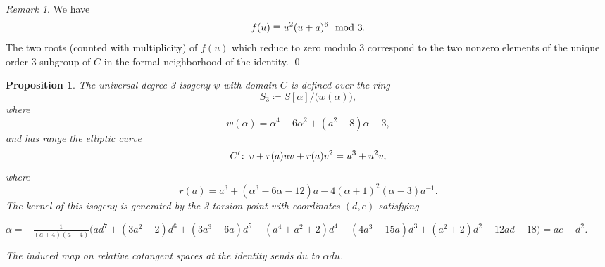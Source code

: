 \documentclass{gtpart}
\newtheorem{prop}[thm]{Proposition}
\theoremstyle{definition}
\theoremstyle{remark}
\newtheorem{rmk}[thm]{Remark}
\def\co{\colon\thinspace}
\newcommand{\md}{~~{\rm mod}~}
\newcommand{\A}{\alpha}
\begin{document}
\begin{rmk}
\label{rmk:dmod3}
 We have 
 \[
  f(u) \equiv u^2 (u + a)^6 \md 3.  
 \]
 The two roots (counted with multiplicity) of $f(u)$ which reduce to zero modulo 3 correspond to 
 the two nonzero elements of the unique order 3 subgroup of $C$ in the formal neighborhood of the identity.  
\qed
\end{rmk}

\begin{prop}
\label{prop:isog}
 The universal degree 3 isogeny $\psi$ with domain $C$ is defined over the ring 
 \[
  S_3 \coloneqq S[\A] \big/ \big( w(\A) \big), 
 \]
 where 
 \[
  w(\A) = \A^4 - 6 \A^2 + (a^2 - 8) \A - 3, 
 \]
 and has range the elliptic curve 
 \[
  C' \co v + r(a) u v + r(a) v^2 = u^3 + u^2 v, 
 \]
 where 
 \[
  r(a) = a^3 + (\A^3 - 6 \A - 12) a - 4 (\A + 1)^2 (\A - 3) a^{-1}.  
 \]
 The kernel of this isogeny is generated by the 3-torsion point with coordinates $(d,e)$ satisfying 

 $\A = -\frac{1}{(a + 4) (a - 4)} \big(a d^7 + (3 a^2 - 2) d^6 + (3 a^3 - 6 a) d^5 + (a^4 + a^2 + 2) d^4 + (4 a^3 - 15 a) d^3 + (a^2 + 2) d^2 - 12 a d -18\big) = a e - d^2$.  

 The induced map on relative cotangent spaces at the identity sends $du$ to $\A du$.  
\end{prop}
\end{document}
